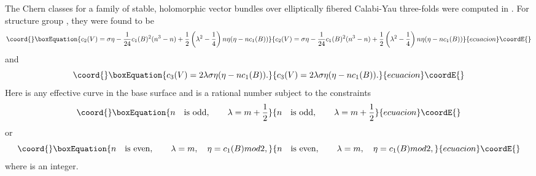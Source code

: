 \documentclass[a4paper,12pt]{article}
\numberwithin{equation}{section}
\theoremstyle{plain}
\begin{document}
The Chern classes for a family of stable, holomorphic vector bundles \coordHE{}
over elliptically fibered Calabi-Yau three-folds were computed in
\cite{FMW1,FMW2}. For
structure group \coordHE{}, they were found to be
%
\begin{equation}\coord{}\boxEquation{
c_{2}(V)=\sigma \eta - \frac{1}{24}c_{1}(B)^{2}(n^{3}-n) + \frac{1}{2}
\left(\lambda^{2}-\frac{1}{4}\right)n\eta(\eta-nc_{1}(B))
\label{eq:41}
}{
c_{2}(V)=\sigma \eta - \frac{1}{24}c_{1}(B)^{2}(n^{3}-n) + \frac{1}{2}
\left(\lambda^{2}-\frac{1}{4}\right)n\eta(\eta-nc_{1}(B))
}{ecuacion}\coordE{}\end{equation}
%
and
%
\begin{equation}\coord{}\boxEquation{
c_{3}(V)=2\lambda \sigma \eta(\eta-nc_{1}(B)).
\label{eq:42}
}{
c_{3}(V)=2\lambda \sigma \eta(\eta-nc_{1}(B)).
}{ecuacion}\coordE{}\end{equation}
%
Here \myHighlight{$\eta$}\coordHE{} is any effective curve in the base surface \coordHE{} and \myHighlight{$\lambda$}\coordHE{} is a
rational number subject to the constraints
%
\begin{equation}\coord{}\boxEquation{
n \quad \mbox{is odd}, \qquad \lambda=m+\frac{1}{2}
\label{eq:43}
}{
n \quad \mbox{is odd}, \qquad \lambda=m+\frac{1}{2}
}{ecuacion}\coordE{}\end{equation}
%
or
%
\begin{equation}\coord{}\boxEquation{
n \quad \mbox{is even}, \qquad \lambda=m, \quad \eta=c_{1}(B)mod2,
\label{eq:44}
}{
n \quad \mbox{is even}, \qquad \lambda=m, \quad \eta=c_{1}(B)mod2,
}{ecuacion}\coordE{}\end{equation}
%
where \coordHE{} is an integer.
\end{document}
